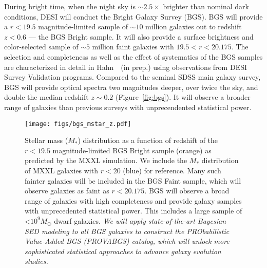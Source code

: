During bright time, when the night sky is ${\sim}2.5\times$ brighter than
nominal dark conditions, DESI will conduct the Bright Galaxy Survey (BGS).
BGS will provide a $r < 19.5$ magnitude-limited sample of ${\sim}10$ million
galaxies out to redshift $z < 0.6$ --- the BGS Bright sample. 
It will also provide a surface brightness and color-selected sample of 
${\sim}5$ million faint galaxies with $19.5 < r < 20.175$. 
The selection and completeness as well as the effect of systematics of the BGS
samples are characterized in detail in Hahn~\etal~(in prep.) using observations
from DESI Survey Validation programs. 
Compared to the seminal SDSS main galaxy survey, BGS will provide optical
spectra two magnitudes deeper, over twice the sky, and double the median
redshift $z{\sim}0.2$ (Figure~\ref{fig:bgs}). 
It will observe a broader range of galaxies than previous surveys with
unprecendented statistical power. 

\begin{figure}
\begin{center}
    \texttt{[image: figs/bgs\_mstar\_z.pdf]}
    \caption{
        Stellar mass ($M_*$) distribution as a function of redshift of the 
        $r < 19.5$ magnitude-limited BGS Bright sample (orange) as predicted by
        the MXXL simulation. 
        We include the $M_*$ distribution of MXXL galaxies with $r < 20$ (blue)
        for reference.
        Many such fainter galaxies will be included in the BGS Faint sample,
        which will observe galaxies as faint as $r < 20.175$. 
        BGS will observe a broad range of galaxies with high completeness and
        provide galaxy samples with unprecedented statistical power.
        This includes a large sample of <$10^9M_\odot$ dwarf galaxies. %
        \emph{We will apply state-of-the-art Bayesian SED modeling to all BGS
        galaxies to construct the PRObabilistic Value-Added BGS (PROVABGS)
        catalog, which will unlock more sophisticated statistical approaches to
        advance galaxy evolution studies.}}\label{fig:bgs_mstar}
\end{center}
\end{figure}

